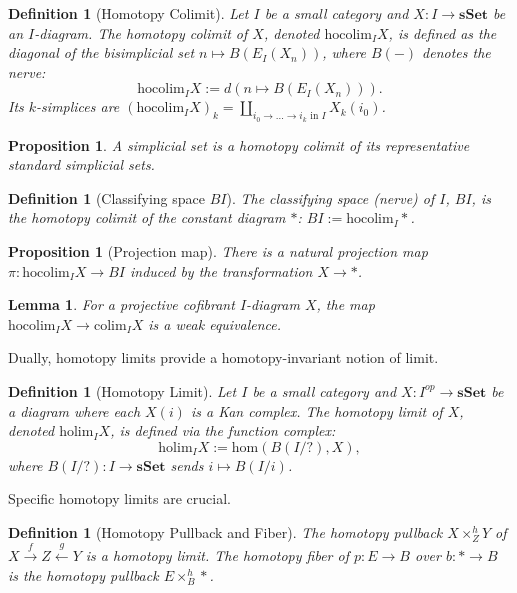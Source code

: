 \documentclass[12pt]{report}
\numberwithin{equation}{section}
\newtheorem{definition}[dummy]{Definition}
\newtheorem{lemma}[dummy]{Lemma}
\newtheorem{proposition}[dummy]{Proposition}
\begin{document}
	\begin{definition}[Homotopy Colimit]\label{def:homotopycolimit}
		Let $I$ be a small category and $X: I \to \mathbf{sSet}$ be an $I$-diagram. The homotopy colimit of $X$, denoted $\mathrm{hocolim}_{I} X$, is defined as the diagonal of the bisimplicial set $n \mapsto B(E_I(X_n))$, where $B(-)$ denotes the nerve:
		\[ \mathrm{hocolim}_{I} X := d( n \mapsto B(E_I(X_n)) ). \]
		Its $k$-simplices are $(\mathrm{hocolim}_{I} X)_k = \coprod_{i_0 \to \dots \to i_k \text{ in } I} X_k(i_0)$.
	\end{definition}
	
	\begin{proposition}
		A simplicial set is a homotopy colimit of its representative standard simplicial sets.
	\end{proposition}
	
	\begin{definition}[Classifying space $BI$]
		The classifying space (nerve) of $I$, $BI$, is the homotopy colimit of the constant diagram $*$: $BI := \mathrm{hocolim}_{I} *$.
	\end{definition}
	
	\begin{proposition}[Projection map]
		There is a natural projection map $\pi: \mathrm{hocolim}_{I} X \to BI$ induced by the transformation $X \to *$.
	\end{proposition}
	
	\begin{lemma}\label{lem:hocolim_vs_colim_condensed}
		For a projective cofibrant $I$-diagram $X$, the map $\mathrm{hocolim}_{I} X \to \mathrm{colim}_{I} X$ is a weak equivalence.
	\end{lemma}
	
	Dually, homotopy limits provide a homotopy-invariant notion of limit.
	
	\begin{definition}[Homotopy Limit]
		Let $I$ be a small category and $X: I^{op} \to \mathbf{sSet}$ be a diagram where each $X(i)$ is a Kan complex. The homotopy limit of $X$, denoted $\mathrm{holim}_{I} X$, is defined via the function complex:
		\[ \mathrm{holim}_{I} X := \mathrm{hom}(B(I/?), X), \]
		where $B(I/?): I \to \mathbf{sSet}$ sends $i \mapsto B(I/i)$.
	\end{definition}
	
	Specific homotopy limits are crucial.
	
	\begin{definition}[Homotopy Pullback and Fiber]
		The homotopy pullback $X \times^h_Z Y$ of $X \xrightarrow{f} Z \xleftarrow{g} Y$ is a homotopy limit. The homotopy fiber of $p: E \to B$ over $b: * \to B$ is the homotopy pullback $E \times^h_B *$.
	\end{definition}
	
\end{document}
